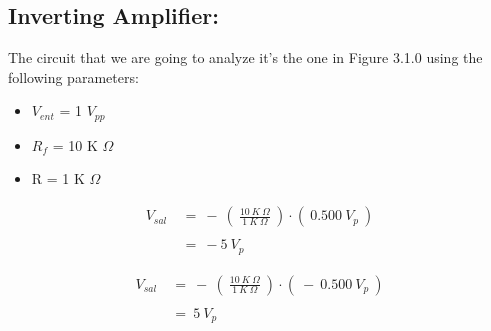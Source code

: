 \subsection{Inverting Amplifier:}

The circuit that we are going to analyze it's the one in Figure 3.1.0 using the following parameters: \hfill \break

{\bfseries
\begin{itemize}
\item $V_{ent}$ = 1 $V_{pp}$
\item $R_{f}$ = 10 K $\Omega$
\item R = 1 K $\Omega$
\end{itemize}} \hfill

{\bfseries\itshape{}} 

\begin{flushright}
{\bfseries\itshape{}} \hfill \break
\end{flushright}

\begin{ceqn}
\begin{align*}
V_{sal}\ &=\ -\ (\ \frac{10\ K\ \Omega}{1\ K\ \Omega}\ ) \cdot (\ 0.500\ V_{p}\ ) \\ \\
&=\ -5\ V_{p}
\end{align*}
\end{ceqn} \hfill \break

{\bfseries\itshape{}} 

\begin{flushright}
{\bfseries\itshape{}} \hfill \break
\end{flushright}

\begin{ceqn}
\begin{align*}
V_{sal}\ &=\ -\ (\ \frac{10\ K\ \Omega}{1\ K\ \Omega}\ ) \cdot (\ -\ 0.500\ V_{p}\ ) \\ \\
&=\ 5\ V_{p}
\end{align*}
\end{ceqn} \hfill \break

